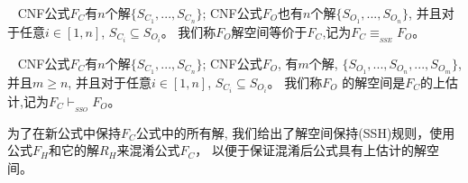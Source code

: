 \begin{definition}\label{SSEdefinition}~
CNF公式$F_C$有$n$个解$\{S_{C_1},...,S_{C_n}\}$;
CNF公式$F_O$也有$n$个解$\{S_{O_1},...,S_{O_n}\}$,
并且对于任意$i \in [1,n]$, $S_{C_i} \subseteq S_{O_i}$。
我们称$F_O$解空间等价于$F_C$,记为$F_C \equiv_{_{SSE}} F_O$。
\end{definition}

\begin{definition}\label{SSOdefinition}~
CNF公式$F_C$有$n$个解$\{S_{C_1},...,S_{C_n}\}$;
CNF公式$F_O$,
有$m$个解, $\{S_{O_1},...,S_{O_n},...,S_{O_m}\}$,
并且$m \geqslant n$,
并且对于任意$i \in [1,n]$, $S_{C_i} \subseteq S_{O_i}$。
我们称$F_O$ 的解空间是$F_C$的上估计,记为$F_C \vdash_{_{SSO}} F_O$。
\end{definition}

为了在新公式中保持$F_C$公式中的所有解,
我们给出了解空间保持(SSH)规则，使用公式$F_H$和它的解$R_H$来混淆公式$F_C$，
以便于保证混淆后公式具有上估计的解空间。


